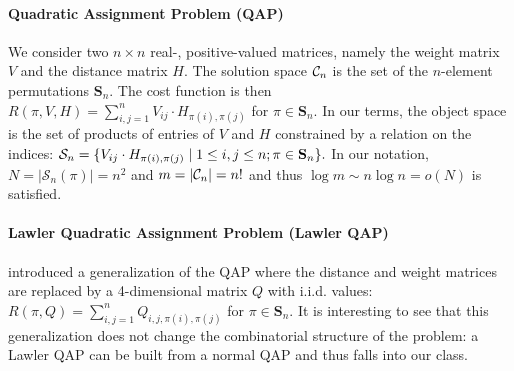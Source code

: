 \paragraph{Quadratic Assignment Problem (QAP)}
\label{sec:free_qap_definition}
We consider two $n\times n$ real-, positive-valued matrices, namely the weight
matrix $V$ and the distance matrix $H$.  The solution space $\C_n$ is the set of
the $n$-element permutations $\mathbf{S}_n$.  The cost function is then $R(\pi,
V, H) = \sum_{i,j=1}^n V_{ij}\cdot H_{\pi(i),\pi(j)}$ for $\pi\in \mathbf{S}_n$. 
In our terms, the object space is the set of products of entries
of $V$ and $H$ constrained by a relation on the indices: $ \S_n = \{ V_{ij}\cdot
H_{\pi(i),\pi(j)} \mid 1 \le i,j \le n; \pi
\in \mathbf{S}_n \}.$
In our notation, $N=|\mathcal{S}_n(\pi)|=n^2$ and $m=|\C_n|=n!$ and thus $\log m
\sim n \log n = o(N)$ is satisfied.

\paragraph{Lawler Quadratic Assignment Problem (Lawler QAP)}
\label{sec:free_lawler}
\cite{lawler1963quadratic} introduced a generalization of the QAP
where the distance and weight matrices are replaced by a 4-dimensional matrix
$Q$ with i.i.d. values: $R(\pi, Q) = \sum_{i,j=1}^n Q_{i,j,\pi(i),\pi(j)}$ for
$\pi\in \mathbf{S}_n$. 
It is interesting to see that this generalization does not
change the combinatorial structure of the problem: a Lawler QAP can be built
from a normal QAP and thus falls into our class.



